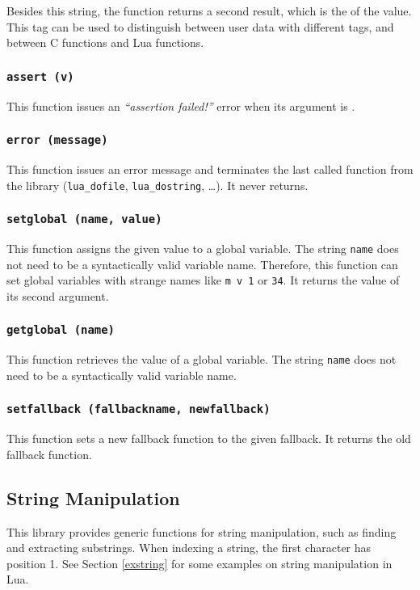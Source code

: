 Besides this string, the function returns a second result,
which is the  of the value.
This tag can be used to distinguish between user
data with different tags,
and between C functions and Lua functions.

\subsubsection*{{\tt assert (v)}}
This function issues an {\em ``assertion failed!''} error
when its argument is \nil.

\subsubsection*{{\tt error (message)}}
This function issues an error message and terminates
the last called function from the library
(\verb'lua_dofile', \verb'lua_dostring', \ldots).
It never returns.

\subsubsection*{{\tt setglobal (name, value)}}
This function assigns the given value to a global variable.
The string \verb'name' does not need to be a syntactically valid variable name.
Therefore, this function can set global variables with strange names like
\verb'm v 1' or \verb'34'.
It returns the value of its second argument.

\subsubsection*{{\tt getglobal (name)}}
This function retrieves the value of a global variable.
The string \verb'name' does not need to be a syntactically valid variable name.

\subsubsection*{{\tt setfallback (fallbackname, newfallback)}}
This function sets a new fallback function to the given fallback.
It returns the old fallback function.

\subsection{String Manipulation}
This library provides generic functions for string manipulation,
such as finding and extracting substrings.
When indexing a string, the first character has position 1.
See Section \ref{exstring} for some examples on string manipulation
in Lua.

